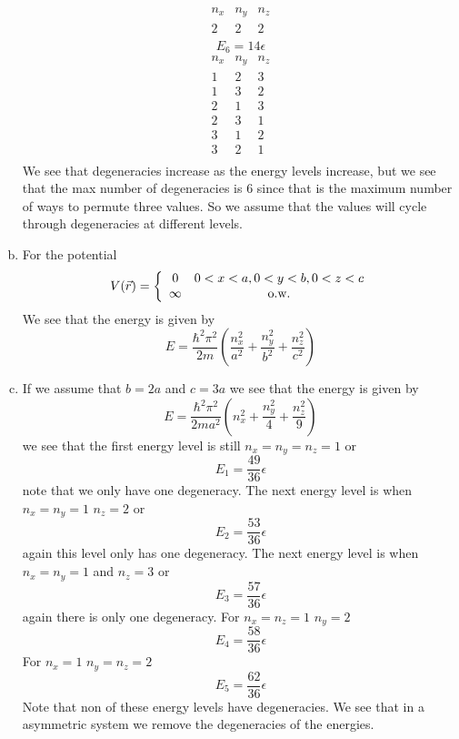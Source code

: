 \documentclass[11pt]{article}
\numberwithin{equation}{section}
\begin{document}
\begin{enumerate}[(a)]
$$\begin{array}{ccc}
n_x	&n_y	&n_z	\\
2	&2	&2	\\
\end{array}$$
$$E_6 = 14\epsilon$$
$$\begin{array}{ccc}
n_x	&n_y	&n_z	\\
1	&2	&3	\\
1	&3	&2	\\
2	&1	&3	\\
2	&3	&1	\\
3	&1	&2	\\
3	&2	&1	\\
\end{array}$$
We see that degeneracies increase as the energy levels increase, but we see that the max number of degeneracies is 6 since that is the maximum number of ways to permute three values. So we assume that the values will cycle through degeneracies at different levels.

\item
For the potential
$$V(\vec{r}) = \left\{\begin{array}{cc}
0	&0<x<a, 0<y<b, 0<z<c\\
\infty	&\textnormal{o.w.}
\end{array}\right.$$
We see that the energy is given by
$$E = \frac{\hbar^2\pi^2}{2m}\left(\frac{n_x^2}{a^2}+\frac{n_y^2}{b^2}+\frac{n_z^2}{c^2}\right)$$

\item
If we assume that $b=2a$ and $c=3a$ we see that the energy is given by
$$E = \frac{\hbar^2\pi^2}{2ma^2}\left(n_x^2+\frac{n_y^2}{4}+\frac{n_z^2}{9}\right)$$
we see that the first energy level is still $n_x=n_y=n_z=1$ or
$$E_1 = \frac{49}{36}\epsilon$$
note that we only have one degeneracy. The next energy level is when $n_x=n_y=1$ $n_z=2$ or
$$E_2 = \frac{53}{36}\epsilon$$
again this level only has one degeneracy. The next energy level is when $n_x=n_y=1$ and $n_z=3$ or
$$E_3 = \frac{57}{36}\epsilon$$
again there is only one degeneracy. 
For $n_x=n_z=1$ $n_y=2$
$$E_4 = \frac{58}{36}\epsilon$$
For $n_x=1$ $n_y=n_z=2$
$$E_5 = \frac{62}{36}\epsilon$$
Note that non of these energy levels have degeneracies. We see that in a asymmetric system we remove the degeneracies of the energies.
\end{enumerate}
\end{document}
